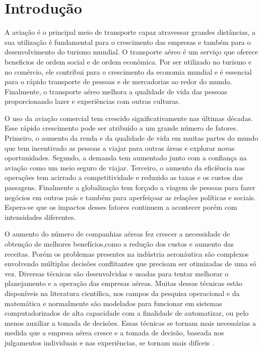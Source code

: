 \chapter{Introdução}
  
  	A aviação é o principal meio de transporte capaz atravessar grandes distâncias, a sua utilização é fundamental para o crescimento das empresas e também para o desenvolvimento do turismo mundial. O transporte aéreo é um serviço que oferece beneficios de ordem social e de ordem econômica. Por ser utilizado no turismo e no comércio, ele contribui para o crescimento da economia mundial e é essencial para o rápido transporte de pessoas e de mercadorias ao redor do mundo. Finalmente, o transporte aéreo melhora a qualidade de vida das pessoas proporcionando lazer e experiências com outras culturas.
  	
  	O uso da aviação comercial tem crescido significativamente nas últimas décadas. Esse rápido crescimento pode ser atribuído a um grande número de fatores. Primeiro, o aumento da renda e da qualidade de vida em muitas partes do mundo que tem incentivado as pessoas a viajar para outras áreas e explorar novas oportunidades. Segundo, a demanda tem aumentado junto com a confiança na aviação como um meio seguro de viajar. Terceiro, o aumento da eficiência nas operações tem acirrado a competitividade e reduzido as taxas e os custos das passagens. Finalmente a globalização tem forçado a viagem de pessoas para fazer negócios em outros país e também para aperfeiçoar as relações políticas e sociais. Espera-se que os impactos desses fatores continuem a acontecer porém com intensidades diferentes.
  	
  	O aumento do número de companhias aéreas fez crescer a necessidade
  	de obtenção de melhores benefícios,como a redução dos custos e aumento das
  	receitas. Porém os problemas presentes na indústria aeronáutica são complexos
  	envolvendo múltiplas decisões conflitantes que precisam ser otimizadas de uma
  	só vez. Diversas técnicas são desenvolvidas e usadas para tentar melhorar o
  	planejamento e a operação das empresas aéreas. Muitas dessas técnicas estão
  	disponíveis na literatura científica, nos campos da pesquisa operacional e da
  	matemática e normalmente são modelados para funcionar em sistemas
  	computadorizados de alta capacidade com a finalidade de automatizar, ou pelo
  	menos auxiliar a tomada de decisões. Essas técnicas se tornam mais
  	necessárias a medida que a empresa aérea cresce e a tomada de decisão,
  	baseada nos julgamentos individuais e nas experiências, se tornam mais
  	difíceis \cite{ahmed2009}.
  	
